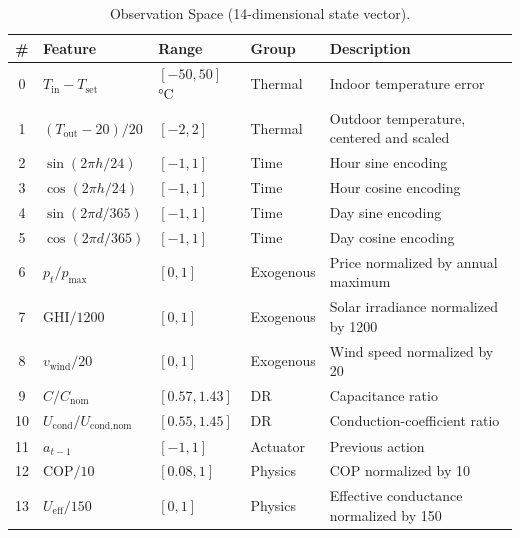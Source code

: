 \documentclass[conference]{IEEEtran}
\begin{document}
\begin{table}[!t]
\centering
\small
\caption{Observation Space (14-dimensional state vector).}
\label{tab:obs}
\begin{tabular}{cllll}
\toprule
\textbf{\#} & \textbf{Feature} & \textbf{Range} & \textbf{Group} & \textbf{Description} \\
\midrule
0  & $T_{\text{in}} - T_{\text{set}}$ & $[-50,50]$\,\si{\degreeCelsius} & Thermal   & Indoor temperature error \\
1  & $(T_{\text{out}}-20)/20$         & $[-2,2]$                        & Thermal   & Outdoor temperature, centered and scaled \\
2  & $\sin(2\pi h/24)$                & $[-1,1]$                        & Time      & Hour sine encoding \\
3  & $\cos(2\pi h/24)$                & $[-1,1]$                        & Time      & Hour cosine encoding \\
4  & $\sin(2\pi d/365)$               & $[-1,1]$                        & Time      & Day sine encoding \\
5  & $\cos(2\pi d/365)$               & $[-1,1]$                        & Time      & Day cosine encoding \\
6  & $p_t / p_{\max}$                 & $[0,1]$                         & Exogenous & Price normalized by annual maximum \\
7  & GHI$/1200$                       & $[0,1]$                         & Exogenous & Solar irradiance normalized by 1200 \\
8  & $v_{\text{wind}}/20$             & $[0,1]$                         & Exogenous & Wind speed normalized by 20 \\
9  & $C / C_{\text{nom}}$             & $[0.57,1.43]$                   & DR        & Capacitance ratio \\
10 & $U_{\text{cond}} / U_{\text{cond,nom}}$ & $[0.55,1.45]$               & DR        & Conduction-coefficient ratio \\
11 & $a_{t-1}$                        & $[-1,1]$                        & Actuator  & Previous action \\
12 & COP$/10$                         & $[0.08,1]$                      & Physics   & COP normalized by 10 \\
13 & $U_{\text{eff}}/150$             & $[0,1]$                         & Physics   & Effective conductance normalized by 150 \\
\bottomrule
\end{tabular}
\end{table}
\end{document}
